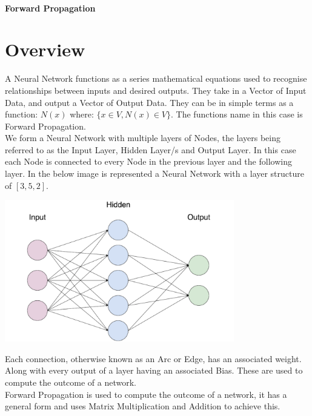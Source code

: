 \begin{flushleft}
            \subsubsection{Forward Propagation}
                \chapter{Overview}
                    \vspace{0.2cm}
                    A Neural Network functions as a series mathematical equations used to recognise relationships between inputs
                    and desired outputs. They take in a Vector of Input Data, and output a Vector of Output Data. They can be
                    in simple terms as a function: $N(x)$ where: $\{x \in V, N(x) \in V\}$. The functions name in this case is
                    Forward Propagation. \\
                    \vspace{0.2cm}
                    We form a Neural Network with multiple layers of Nodes, the layers being referred to as the Input Layer, 
                    Hidden Layer/s and Output Layer. In this case each Node is connected to every Node in the previous layer and
                    the following layer. In the below image is represented a Neural Network with a layer structure of $[3, 5, 2]$.

                    \vspace{0.1cm}
                    \centerline{\includegraphics[width=10cm]{Images/InitialResearch/NeuralNetworkExample.png}}

                    Each connection, otherwise known as an Arc or Edge, has an associated weight. Along with every output of a
                    layer having an associated Bias. These are used to compute the outcome of a network. \\
                    \vspace{0.2cm}
                    Forward Propagation is used to compute the outcome of a network, it has a general form and uses 
                    Matrix Multiplication and Addition to achieve this.
                    \vspace{0.2cm}
                    

\end{flushleft}
